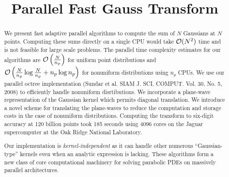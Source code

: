 \documentclass[conference]{IEEEtran}
\begin{document}
\title{Parallel Fast Gauss Transform}  


\author{

\and
{}

\and
{}
}
\date{}
\maketitle

\begin{abstract}
We present fast adaptive parallel algorithms to compute the sum of $N$ Gaussians at $N$ points. 
Computing these sums directly on a single CPU would take $\mathcal{O}(N^2)$ time and is not feasible
for large scale problems. The parallel time complexity estimates for our algorithms are $ \mathcal{O} \left(\frac{N}{n_p} \right)$ 
for uniform point distributions and $ \mathcal{O}\left(\frac{N}{n_p}\log \frac{N}{n_p} + n_p \log n_p\right)$ 
for nonuniform distributions using $n_p$ CPUs. We use our parallel octree implementation (Sundar et al. 
SIAM J. SCI. COMPUT. Vol. 30, No. 5, 2008) to efficiently handle nonuniform disrtibutions. We incorporate
 a plane-wave representation of the Gaussian kernel which permits diagonal translation. We introduce a 
 novel scheme for translating the plane-waves to reduce the computation and storage costs in the case of 
 nonuniform distributions. Computing the transform to six-digit accuracy at 120 billion points took
 185 seconds using 4096 cores on the Jaguar supercomputer at the Oak Ridge National Laboratory. 

Our implementation is {\em kernel-independent} as it can handle other numerous ``Gaussian-type'' kernels even
 when an analytic expression is lacking. These algorithms form a new class of core computational machinery 
 for solving parabolic PDEs on massively parallel architectures. 
\end{abstract}
\end{document}

